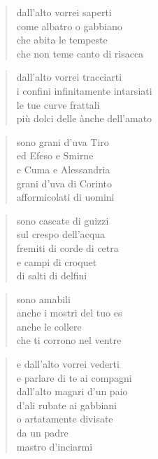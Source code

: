 \clearpage



	\begin{verse}
		dall’alto vorrei saperti\\
		come albatro o gabbiano\\
		che abita le tempeste\\
		che non teme canto di risacca
	\end{verse}

	\begin{verse}
		dall’alto vorrei tracciarti\\
		i confini infinitamente intarsiati\\
		le tue curve frattali\\
		più dolci delle ànche dell’amato
	\end{verse}

	\begin{verse}
		sono grani d’uva Tiro\\
		ed Efeso e Smirne\\
		e Cuma e Alessandria\\
		grani d’uva di Corinto\\
		afformicolati di uomini
	\end{verse}

	\begin{verse}
		sono cascate di guizzi\\
		sul crespo dell’acqua\\
		fremiti di corde di cetra\\
		e campi di croquet\\
		di salti di delfini
	\end{verse}

	\begin{verse}
		sono amabili\\
		anche i mostri del tuo es\\
		anche le collere\\
		che ti corrono nel ventre
	\end{verse}

	\begin{verse}
		e dall’alto vorrei vederti\\
		e parlare di te ai compagni\\
		dall’alto magari d’un paio\\
		d’ali rubate ai gabbiani\\
		o artatamente divisate\\
		da un padre\\
		mastro d’inciarmi
	\end{verse}


